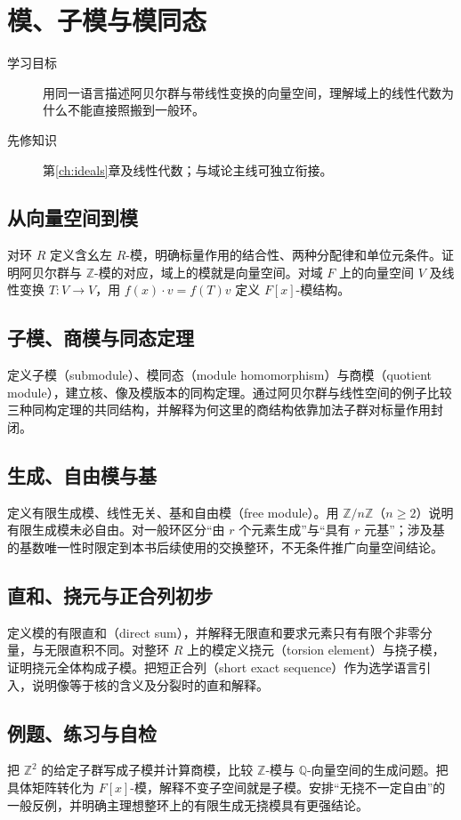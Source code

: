 \setcounter{chapter}{19} %
\chapter{模、子模与模同态}\label{ch:modules}

\begin{description}
  \item[学习目标] 用同一语言描述阿贝尔群与带线性变换的向量空间，理解域上的线性代数为什么不能直接照搬到一般环。
  \item[先修知识] 第\ref{ch:ideals}章及线性代数；与域论主线可独立衔接。
\end{description}

\section{从向量空间到模}
对环 $R$ 定义含幺左 $R$-模，明确标量作用的结合性、两种分配律和单位元条件。证明阿贝尔群与 $\mathbb Z$-模的对应，域上的模就是向量空间。对域 $F$ 上的向量空间 $V$ 及线性变换 $T:V\to V$，用 $f(x)\cdot v=f(T)v$ 定义 $F[x]$-模结构。

\section{子模、商模与同态定理}
定义子模（submodule）、模同态（module homomorphism）与商模（quotient module），建立核、像及模版本的同构定理。通过阿贝尔群与线性空间的例子比较三种同构定理的共同结构，并解释为何这里的商结构依靠加法子群对标量作用封闭。

\section{生成、自由模与基}
定义有限生成模、线性无关、基和自由模（free module）。用 $\mathbb Z/n\mathbb Z$（$n\geq2$）说明有限生成模未必自由。对一般环区分“由 $r$ 个元素生成”与“具有 $r$ 元基”；涉及基的基数唯一性时限定到本书后续使用的交换整环，不无条件推广向量空间结论。

\section{直和、挠元与正合列初步}
定义模的有限直和（direct sum），并解释无限直和要求元素只有有限个非零分量，与无限直积不同。对整环 $R$ 上的模定义挠元（torsion element）与挠子模，证明挠元全体构成子模。把短正合列（short exact sequence）作为选学语言引入，说明像等于核的含义及分裂时的直和解释。

\section{例题、练习与自检}
把 $\mathbb Z^2$ 的给定子群写成子模并计算商模，比较 $\mathbb Z$-模与 $\mathbb Q$-向量空间的生成问题。把具体矩阵转化为 $F[x]$-模，解释不变子空间就是子模。安排“无挠不一定自由”的一般反例，并明确主理想整环上的有限生成无挠模具有更强结论。

